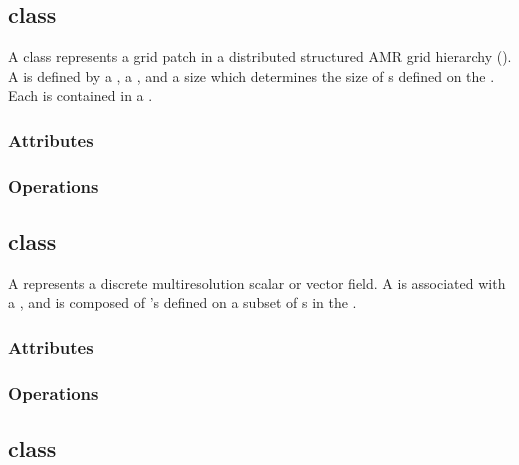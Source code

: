 \documentclass{article}
\begin{document}
\subsection{ class}

A  class represents a grid patch in a distributed structured
AMR grid hierarchy ().  A  is defined by a
, a , and a size which determines
the size of s defined on the .  Each
 is contained in a .

\subsubsection{Attributes}

\subsubsection{Operations}

\subsection{ class}

A  represents a discrete multiresolution scalar or vector
field.  A  is associated with a , and is
composed of 's defined on a subset of s in the
.

\subsubsection{Attributes}

\subsubsection{Operations}

\subsection{ class}
\end{document}
